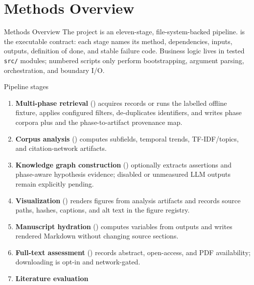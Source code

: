 \documentclass[
  ignorenonframetext,
]{beamer}
\author{}
\date{}
\providecommand{\tightlist}{%
  \setlength{\itemsep}{0pt}\setlength{\parskip}{0pt}}
\begin{document}
\section{Methods Overview}\label{methods-overview}

\begin{frame}{Methods Overview}
The project is an eleven-stage, file-system-backed pipeline.
 is the executable contract: each stage
names its method, dependencies, inputs, outputs, definition of done, and
stable failure code. Business logic lives in tested \texttt{src/}
modules; numbered scripts only perform bootstrapping, argument parsing,
orchestration, and boundary I/O.
\end{frame}

\begin{frame}{Pipeline stages}
\label{pipeline-stages}
\begin{enumerate}
\tightlist
\item
  \textbf{Multi-phase retrieval} ()
  acquires records or runs the labelled offline fixture, applies
  configured filters, de-duplicates identifiers, and writes phase
  corpora plus  and the
   phase-to-artifact provenance
  map.
\item
  \textbf{Corpus analysis} ()
  computes subfields, temporal trends, TF-IDF/topics, and
  citation-network artifacts.
\item
  \textbf{Knowledge graph construction}
  () optionally extracts
  assertions and phase-aware hypothesis evidence; disabled or unmeasured
  LLM outputs remain explicitly pending.
\item
  \textbf{Visualization} () renders
  figures from analysis artifacts and records source paths, hashes,
  captions, and alt text in the figure registry.
\item
  \textbf{Manuscript hydration} ()
  computes variables from outputs and writes rendered Markdown without
  changing source sections.
\item
  \textbf{Full-text assessment} ()
  records abstract, open-access, and PDF availability; downloading is
  opt-in and network-gated.
\item
  \textbf{Literature evaluation}

\end{enumerate}
\end{frame}
\end{document}
